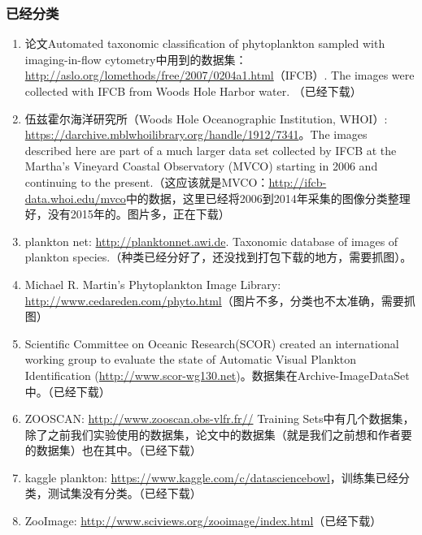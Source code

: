 \subsubsection{已经分类}
\begin{enumerate}
\item 论文Automated taxonomic classification of phytoplankton sampled with imaging-in-flow cytometry中用到的数据集：\url{http://aslo.org/lomethods/free/2007/0204a1.html}（IFCB）. The images were collected with IFCB from Woods Hole Harbor water. （已经下载）

\item 伍兹霍尔海洋研究所（Woods Hole Oceanographic Institution, WHOI）: \url{https://darchive.mblwhoilibrary.org/handle/1912/7341}。The images described here are part of a much larger data set collected by IFCB at the Martha's Vineyard Coastal Observatory (MVCO) starting in 2006 and continuing to the present.（这应该就是MVCO：\url{http://ifcb-data.whoi.edu/mvco}中的数据，这里已经将2006到2014年采集的图像分类整理好，没有2015年的。图片多，正在下载）

\item plankton net: \url{http://planktonnet.awi.de}. Taxonomic database of images of plankton species.（种类已经分好了，还没找到打包下载的地方，需要抓图）。

\item Michael R. Martin's Phytoplankton Image Library: \url{http://www.cedareden.com/phyto.html}（图片不多，分类也不太准确，需要抓图）\newline

\item Scientific Committee on Oceanic Research(SCOR) created an international working group to evaluate the state of Automatic Visual Plankton Identification (\url{http://www.scor-wg130.net})\cite{gorsky2010digital}。数据集在Archive-ImageDataSet中。（已经下载）

\item ZOOSCAN: \url{http://www.zooscan.obs-vlfr.fr//} Training Sets中有几个数据集，除了之前我们实验使用的数据集，论文中的数据集（就是我们之前想和作者要的数据集）也在其中。（已经下载）

\item kaggle plankton: \url{https://www.kaggle.com/c/datasciencebowl}，训练集已经分类，测试集没有分类。（已经下载）

\item ZooImage: \url{http://www.sciviews.org/zooimage/index.html}（已经下载）
\end{enumerate}

